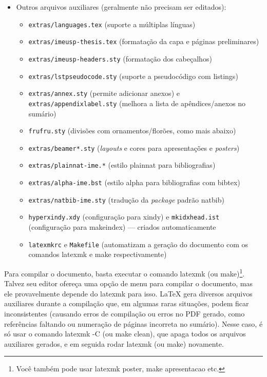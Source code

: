 \begin{itemize}
  \item Outros arquivos auxiliares (geralmente não precisam ser editados):
  \begin{itemize}
    \item \texttt{extras/languages.tex} (suporte a múltiplas línguas)
    \item \texttt{extras/imeusp-thesis.tex} (formatação da capa e páginas preliminares)
    \item \texttt{extras/imeusp-headers.sty} (formatação dos cabeçalhos)
    \item \texttt{extras/lstpseudocode.sty} (suporte a pseudocódigo com \textsf{listings})
    \item \texttt{extras/annex.sty} (permite adicionar anexos) e
          \texttt{extras/appendixlabel.sty} (melhora a lista de
          apêndices/anexos no sumário)
    \item \texttt{frufru.sty} (divisões com ornamentos/florões, como mais abaixo)
    \item \texttt{extras/beamer*.sty} (\textit{layouts} e cores para
          apresentações e \textit{posters})
    \item \texttt{extras/plainnat-ime.*} (estilo plainnat para bibliografias)
    \item \texttt{extras/alpha-ime.bst} (estilo alpha para bibliografias com
          bibtex)
    \item \texttt{extras/natbib-ime.sty} (tradução da \textit{package}
          padrão natbib)
    \item \texttt{hyperxindy.xdy} (configuração para xindy) e
          \texttt{mkidxhead.ist} (configuração para makeindex) --- criados automaticamente
    \item \texttt{latexmkrc} e \texttt{Makefile} (automatizam a geração do
          documento com os comandos \textsf{latexmk} e \textsf{make} respectivamente)
  \end{itemize}
\end{itemize}

\frufru

Para compilar o documento, basta executar o comando \textsf{latexmk} (ou
\textsf{make})\footnote{Você também pode usar \textsf{latexmk poster},
\textsf{make apresentacao} etc.}. Talvez seu editor ofereça uma
opção de menu para compilar o documento, mas ele provavelmente depende do
\textsf{latexmk} para isso. \LaTeX{} gera diversos arquivos auxiliares
durante a compilação que, em algumas raras situações, podem ficar
inconsistentes (causando erros de compilação ou erros no PDF gerado, como
referências faltando ou numeração de páginas incorreta no sumário). Nesse
caso, é só usar o comando \textsf{latexmk -C} (ou \textsf{make clean}),
que apaga todos os arquivos auxiliares gerados, e em seguida rodar
\textsf{latexmk} (ou \textsf{make}) novamente.

